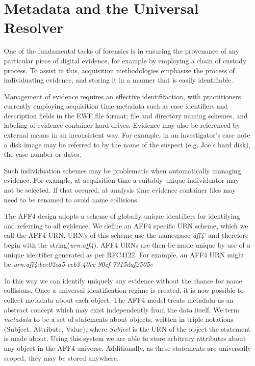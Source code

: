 \documentclass[10pt, conference]{IEEEtran}
\begin{document}
\section{Metadata and the Universal Resolver}
\label{resolver}
One of the fundamental tasks of forensics is in ensuring the
provenance of any particular piece of digital evidence, for example by
employing a chain of custody process. To assist in this, acquisition
methodologies emphasise the process of individuating evidence, and
storing it in a manner that is easily identifiable.

Management of evidence requires an effective identififaction, with
practitioners currently employing acquisition time metadata such as
case identifiers and description fields in the EWF file format; file
and directory naming schemes, and labeling of evidence container hard
drives. Evidence may also be referenced by external means in an
inconsistent way. For example, in an investigator's case note a disk
image may be referred to by the name of the suspect (e.g. Joe's hard
disk), the case number or dates.

Such individuation schemes may be problematic when automatically
managing evidence. For example, at acquisition time a suitably unique
individuator may not be selected. If that occured, at analysis time
evidence container files may need to be renamed to avoid name
collisions.

The AFF4 design adopts a scheme of globally unique identifiers for
identifying and referring to all evidence. We define an AFF4 specific
URN scheme, which we call the AFF4 URN. URN's of this scheme use the
namespace\cite{RFC1737} \emph{\'aff4\'} and therefore begin with the 
string(\emph{urn:aff4}). AFF4 URNs are then be made unique by use of 
a unique identifier generated
as per RFC4122\cite{RFC4122}. For example, an AFF4 URN might be
\emph{urn:aff4:bcc02ea5-eeb3-40ce-90cf-7315daf2505e}

In this way we can identify uniquely any evidence without the chance
for name collisions. Once a universal identification regime is
created, it is now possible to collect metadata about each object. The
AFF4 model treats metadata as an abstract concept which may exist
independently from the data itself. We term {\em metadata} to be a set
of statements about objects, written in triple notations (Subject,
Attribute, Value), where {\em Subject} is the URN of the object the
statement is made about. Using this system we are able to store
arbitrary attributes about any object in the AFF4 universe. Additionally,
as these statements are universally scoped, they may be stored anywhere.
\end{document}

